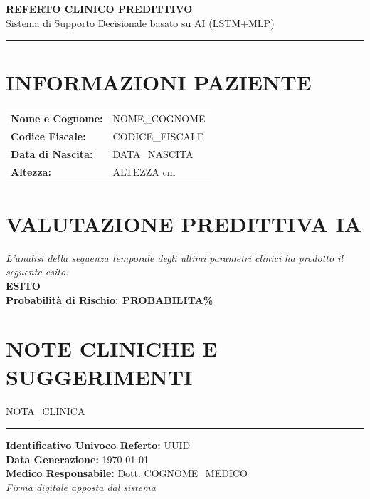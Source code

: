 \documentclass[11pt]{article}
\begin{document}
\begin{center}
    {\huge \textbf{REFERTO CLINICO PREDITTIVO}} \\
    \vspace{2mm}
    {\large Sistema di Supporto Decisionale basato su AI (LSTM+MLP)} \\
    \vspace{5mm}
    \rule{\textwidth}{1pt}
\end{center}

\section*{INFORMAZIONI PAZIENTE}
\begin{tabular}{ll}
    \textbf{Nome e Cognome:} & {{NOME_COGNOME}} \\
    \textbf{Codice Fiscale:} & {{CODICE_FISCALE}} \\
    \textbf{Data di Nascita:} & {{DATA_NASCITA}} \\
    \textbf{Altezza:} & {{ALTEZZA}} cm \\
\end{tabular}

\vspace{1cm}

\section*{VALUTAZIONE PREDITTIVA IA}
\vspace{5mm}
\begin{center}
    \begin{minipage}{0.8\textwidth}
        \centering
        \textit{L'analisi della sequenza temporale degli ultimi parametri clinici ha prodotto il seguente esito:} \\
        \vspace{5mm}
        {\Huge \textbf{ {{ESITO}}}} \\
        \vspace{3mm}
        {\Large \textbf{Probabilità di Rischio: {{PROBABILITA}}\%}}
    \end{minipage}
\end{center}

\vspace{1cm}

\section*{NOTE CLINICHE E SUGGERIMENTI}
{{NOTA_CLINICA}}

\vfill

\rule{\textwidth}{0.5pt}
\begin{flushright}
    \small
    \textbf{Identificativo Univoco Referto:} {{UUID}} \\
    \textbf{Data Generazione:} \today \\
    \textbf{Medico Responsabile:} Dott. {{COGNOME_MEDICO}} \\
    \vspace{10mm}
    \textit{Firma digitale apposta dal sistema}
\end{flushright}
\end{document}

